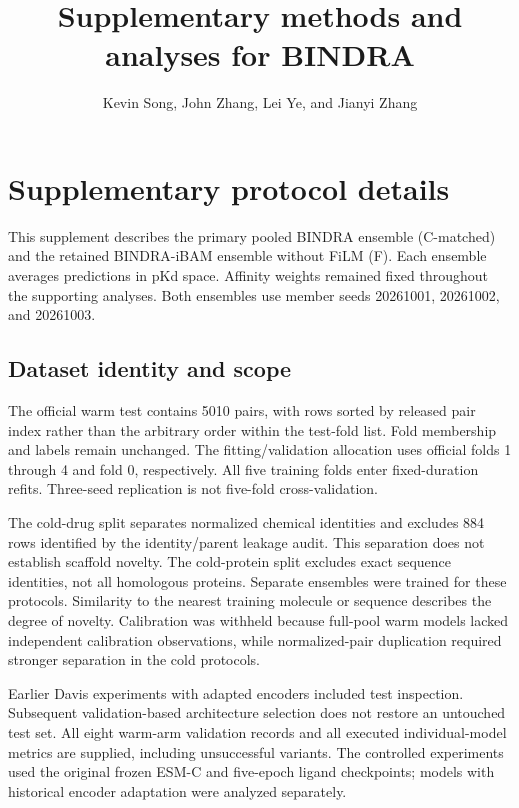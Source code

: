\documentclass[12pt,a4paper]{article}
\begin{document}
\renewcommand{\thefigure}{S\arabic{figure}}\renewcommand{\thetable}{S\arabic{table}}\title{Supplementary methods and analyses for BINDRA}
\author{\normalsize Kevin Song, John Zhang, Lei Ye, and Jianyi Zhang}
\date{}
\begin{singlespace}\maketitle\end{singlespace}
\linenumbers
\section*{Supplementary protocol details}
This supplement describes the primary pooled BINDRA ensemble (C-matched) and the retained BINDRA-iBAM ensemble without FiLM (F). Each ensemble averages predictions in pKd space. Affinity weights remained fixed throughout the supporting analyses. Both ensembles use member seeds 20261001, 20261002, and 20261003.

\subsection*{Dataset identity and scope}
The official warm test contains 5010 pairs, with rows sorted by released pair index rather than the arbitrary order within the test-fold list. Fold membership and labels remain unchanged. The fitting/validation allocation uses official folds 1 through 4 and fold 0, respectively. All five training folds enter fixed-duration refits. Three-seed replication is not five-fold cross-validation.

The cold-drug split separates normalized chemical identities and excludes 884 rows identified by the identity/parent leakage audit. This separation does not establish scaffold novelty. The cold-protein split excludes exact sequence identities, not all homologous proteins. Separate ensembles were trained for these protocols. Similarity to the nearest training molecule or sequence describes the degree of novelty. Calibration was withheld because full-pool warm models lacked independent calibration observations, while normalized-pair duplication required stronger separation in the cold protocols.

Earlier Davis experiments with adapted encoders included test inspection. Subsequent validation-based architecture selection does not restore an untouched test set. All eight warm-arm validation records and all executed individual-model metrics are supplied, including unsuccessful variants. The controlled experiments used the original frozen ESM-C and five-epoch ligand checkpoints; models with historical encoder adaptation were analyzed separately.
\end{document}
